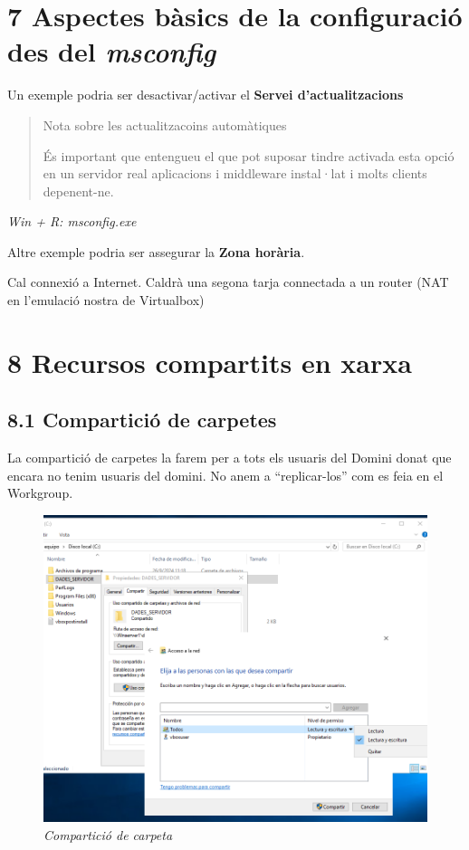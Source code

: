 \documentclass[
  a4paper,
]{article}
\begin{document}
\section{\texorpdfstring{7 Aspectes bàsics de la configuració des del
\emph{msconfig}}{7 Aspectes bàsics de la configuració des del msconfig}}\label{aspectes-buxe0sics-de-la-configuraciuxf3-des-del-msconfig}

Un exemple podria ser desactivar/activar el \textbf{Servei
d'actualitzacions}

\begin{quote}
Nota sobre les actualitzacoins automàtiques

És important que entengueu el que pot suposar tindre activada esta opció
en un servidor real aplicacions i middleware instal·lat i molts clients
depenent-ne.
\end{quote}

\emph{Win + R: msconfig.exe}

Altre exemple podria ser assegurar la \textbf{Zona horària}.

Cal connexió a Internet. Caldrà una segona tarja connectada a un router
(NAT en l'emulació nostra de Virtualbox)

\section{8 Recursos compartits en
xarxa}\label{recursos-compartits-en-xarxa}

\subsection{8.1 Compartició de
carpetes}\label{comparticiuxf3-de-carpetes}

La compartició de carpetes la farem per a tots els usuaris del Domini
donat que encara no tenim usuaris del domini. No anem a ``replicar-los''
com es feia en el Workgroup.

\begin{figure}
\centering
\includegraphics{png/Compartir.png}
\caption{\emph{Compartició de carpeta}}
\end{figure}
\end{document}
